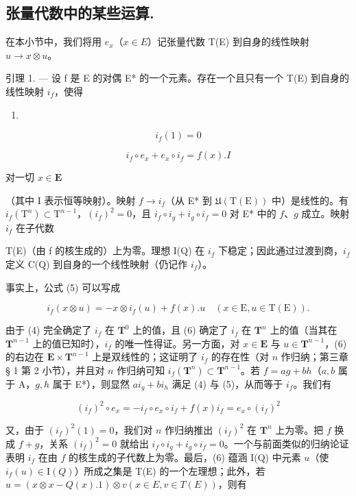 \subsection{张量代数中的某些运算.}

在本小节中，我们将用 \(e_x\)（\(x \in E\)）记张量代数 T(E) 到自身的线性映射 \(u \to x \otimes u\)。

引理 1. — 设 f 是 E 的对偶 E* 的一个元素。存在一个且只有一个 T(E) 到自身的线性映射 \(i_{f}\)，使得

\begin{enumerate}
\def\labelenumi{(\arabic{enumi})}
\setcounter{enumi}{3}
\tightlist
\item
\end{enumerate}

\[
i _ {f} (1) = 0\tag{5}
\]

\[
i _ {f} \circ e _ {x} + e _ {x} \circ i _ {f} = f (x). I
\]

对一切 \(x \in \mathbf{E}\)

（其中 I 表示恒等映射）。映射 \(f \to i_f\)（从 E* 到 \(\mathfrak{U}(\mathrm{T}(\mathrm{E}))\) 中）是线性的。有 \(i_f(\mathrm{T}^n) \subset \mathrm{T}^{n-1}\)，\((i_f)^2 = 0\)，且 \(i_f \circ i_g + i_g \circ i_f = 0\) 对 E* 中的 \(f\)、\(g\) 成立。映射 \(i_f\) 在子代数

T(E)（由 f 的核生成的）上为零。理想 I(Q) 在 \(i_{f}\) 下稳定；因此通过过渡到商，\(i_{f}\) 定义 C(Q) 到自身的一个线性映射（仍记作 \(i_{f}\)）。

  事实上，公式 (5) 可以写成

\[
i _ {f} (x \otimes u) = - x \otimes i _ {f} (u) + f (x). u \quad (x \in \mathrm{E}, u \in \mathrm{T(E)}).\tag{6}
\]

  由于 (4) 完全确定了 \(i_{f}\) 在 \(\mathbf{T}^{0}\) 上的值，且 (6) 确定了 \(i_{f}\) 在 \(\mathbf{T}^{n}\) 上的值（当其在 \(\mathbf{T}^{n-1}\) 上的值已知时），\(i_{f}\) 的唯一性得证。另一方面，对 \(x\in\mathbf{E}\) 与 \(u\in\mathbf{T}^{n-1}\)，(6) 的右边在 \(\mathbf{E}\times\mathbf{T}^{n-1}\) 上是双线性的；这证明了 \(i_{f}\) 的存在性（对 \(n\) 作归纳；第三章 § 1 第 2 小节），并且对 \(n\) 作归纳可知 \(i_{f}(\mathbf{T}^{n})\subset\mathbf{T}^{n-1}\)。若 \(f=ag+bh\)（\(a,b\) 属于 A，\(g,h\) 属于 E*），则显然 \(ai_{g}+bi_{h}\) 满足 (4) 与 (5)，从而等于 \(i_{f}\)。我们有

\[
(i _ {f}) ^ {2} \circ e _ {x} = - i _ {f} \circ e _ {x} \circ i _ {f} + f (x) i _ {f} = e _ {x} \circ (i _ {f}) ^ {2}
\]

  又，由于 \((i_f)^2(1) = 0\)，我们对 \(n\) 作归纳推出 \((i_f)^2\) 在 \(\mathbf{T}^n\) 上为零。把 \(f\) 换成 \(f + g\)，关系 \((i_f)^2 = 0\) 就给出 \(i_f \circ i_g + i_g \circ i_f = 0\)。一个与前面类似的归纳论证表明 \(i_f\) 在由 \(f\) 的核生成的子代数上为零。最后，(6) 蕴涵 I(Q) 中元素 \(u\)（使 \(i_f(u) \in \mathrm{I}(Q)\)）所成之集是 T(E) 的一个左理想；此外，若 \(u = (x \otimes x - Q(x).1) \otimes v (x \in E, v \in T(E))\)，则有

